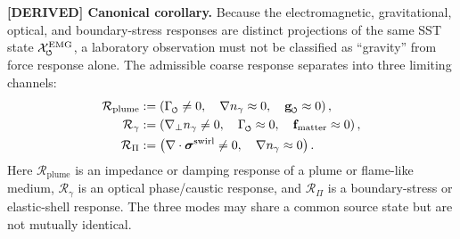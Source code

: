 \documentclass[11pt]{article}
\theoremstyle{definition}
\theoremstyle{plain}
\theoremstyle{remark}
\newcommand{\swirlarrow}{\mathchoice{\mkern-2mu\scriptstyle\boldsymbol{\circlearrowleft}}{\mkern-2mu\scriptstyle\boldsymbol{\circlearrowleft}}{\mkern-2mu\scriptscriptstyle\boldsymbol{\circlearrowleft}}{\mkern-2mu\scriptscriptstyle\boldsymbol{\circlearrowleft}}}
\begin{document}
        \textbf{[DERIVED] Canonical corollary.}
        Because the electromagnetic, gravitational, optical, and boundary-stress
        responses are distinct projections of the same SST state
        \(\mathcal{X}^{\mathrm{EMG}}_{\swirlarrow}\), a laboratory observation must not be
        classified as ``gravity'' from force response alone. The admissible coarse
        response separates into three limiting channels:
        \begin{align}
            \mathcal{R}_{\mathrm{plume}}
            &:=
            \left(
            \Gamma_{\swirlarrow}\neq 0,
            \quad
            \nabla n_\gamma \approx 0,
            \quad
            \mathbf{g}_{\swirlarrow}\approx 0
            \right),
            \label{eq:triadic_plume_mode}\\
            \mathcal{R}_{\gamma}
            &:=
            \left(
            \nabla_\perp n_\gamma \neq 0,
            \quad
            \Gamma_{\swirlarrow}\approx 0,
            \quad
            \mathbf{f}_{\mathrm{matter}}\approx 0
            \right),
            \label{eq:triadic_photon_mode}\\
            \mathcal{R}_{\Pi}
            &:=
            \left(
            \nabla\cdot\boldsymbol{\sigma}^{\mathrm{swirl}}\neq0,
            \quad
            \nabla n_\gamma\approx0
            \right).
            \label{eq:triadic_boundary_mode}
        \end{align}
        Here \(\mathcal{R}_{\mathrm{plume}}\) is an impedance or damping response of a
        plume or flame-like medium, \(\mathcal{R}_{\gamma}\) is an optical phase/caustic
        response, and \(\mathcal{R}_{\Pi}\) is a boundary-stress or elastic-shell response.
        The three modes may share a common source state but are not mutually identical.
\end{document}
